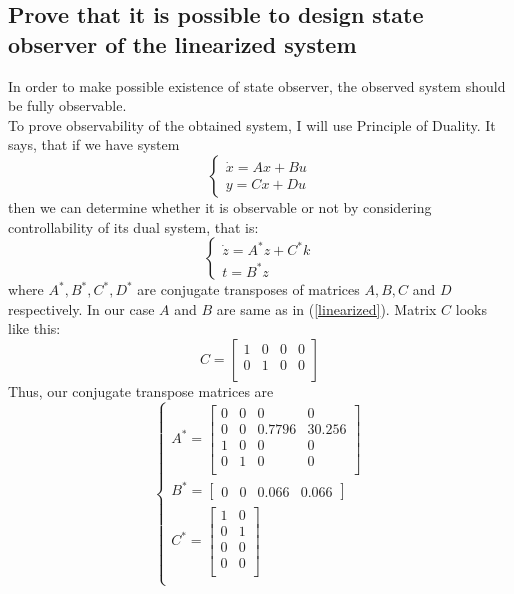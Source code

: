 \documentclass[a4paper,12pt]{article}
\begin{document}
\subsection{Prove that it is possible to design state observer of the linearized
system}
In order to make possible existence of state observer, the observed system should
be fully observable.\\
To prove observability of the obtained system, I will use Principle of Duality.
It says, that if we have system
\begin{equation*}    
    \begin{cases}
        \dot x = Ax + Bu\\
        y = Cx + Du
    \end{cases}
\end{equation*}
then we can determine whether it is observable or not by considering controllability 
of its dual system, that is:
\begin{equation*}    
    \begin{cases}
        \dot z = A^*z + C^*k\\
        t = B^*z
    \end{cases}
\end{equation*}
where $A^*, B^*, C^*, D^*$ are conjugate transposes of matrices $A,B,C$ and $D$ respectively.
In our case $A$ and $B$ are same as in (\ref{linearized}). Matrix $C$ looks like this:
\begin{equation*}
    C=
    \begin{bmatrix}
        1 & 0 & 0 & 0\\
        0 & 1 & 0 & 0\\
    \end{bmatrix}
\end{equation*}
Thus, our conjugate transpose matrices are
\begin{equation*}
    \begin{cases}
        A^*= 
        \begin{bmatrix}
            0 & 0 & 0 & 0\\
            0 & 0 & 0.7796 & 30.256\\
            1 & 0 & 0 & 0\\
            0 & 1 & 0 & 0\\
        \end{bmatrix}\\
        B^*=
        \begin{bmatrix}
            0 & 0 &  0.066 & 0.066 
        \end{bmatrix}\\
        C^*=
        \begin{bmatrix}
            1 & 0 \\
            0 & 1 \\
            0 & 0 \\
            0 & 0 \\
        \end{bmatrix}\\
    \end{cases}
\end{equation*}
\end{document}
